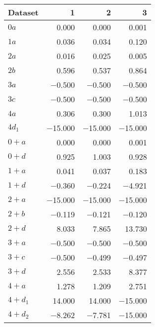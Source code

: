 \begin{tabular}{lrrr}
\toprule
 Dataset   &       1 &       2 &       3 \\
\midrule
 $0 a$     &   \num{0.000} &   \num{0.000} &   \num{0.001} \\
 $1 a$     &   \num{0.036} &   \num{0.034} &   \num{0.120} \\
 $2 a$     &   \num{0.016} &   \num{0.025} &   \num{0.005} \\
 $2 b$     &   \num{0.596} &   \num{0.537} &   \num{0.864} \\
 $3 a$     &  \num{-0.500} &  \num{-0.500} &  \num{-0.500} \\
 $3 c$     &  \num{-0.500} &  \num{-0.500} &  \num{-0.500} \\
 $4 a$     &   \num{0.306} &   \num{0.300} &   \num{1.013} \\
 $4 d_1$   & \num{-15.000} & \num{-15.000} & \num{-15.000} \\
 $0+ a$    &   \num{0.000} &   \num{0.000} &   \num{0.001} \\
 $0+ d$    &   \num{0.925} &   \num{1.003} &   \num{0.928} \\
 $1+ a$    &   \num{0.041} &   \num{0.037} &   \num{0.183} \\
 $1+ d$    &  \num{-0.360} &  \num{-0.224} &  \num{-4.921} \\
 $2+ a$    & \num{-15.000} & \num{-15.000} & \num{-15.000} \\
 $2+ b$    &  \num{-0.119} &  \num{-0.121} &  \num{-0.120} \\
 $2+ d$    &   \num{8.033} &   \num{7.865} &  \num{13.730} \\
 $3+ a$    &  \num{-0.500} &  \num{-0.500} &  \num{-0.500} \\
 $3+ c$    &  \num{-0.500} &  \num{-0.499} &  \num{-0.497} \\
 $3+ d$    &   \num{2.556} &   \num{2.533} &   \num{8.377} \\
 $4+ a$    &   \num{1.278} &   \num{1.209} &   \num{2.751} \\
 $4+ d_1$  &  \num{14.000} &  \num{14.000} & \num{-15.000} \\
 $4+ d_2$  &  \num{-8.262} &  \num{-7.781} & \num{-15.000} \\
\bottomrule
\end{tabular}